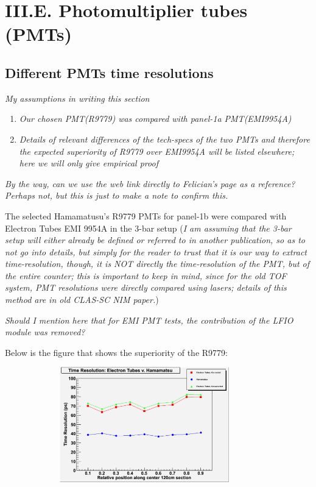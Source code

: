 \documentclass[12pt]{article}
\begin{document}
\maketitle


\section{III.E. Photomultiplier tubes (PMTs)}

\subsection{Different PMTs time resolutions}
\textit{My assumptions in writing this section}
\begin{enumerate}
	\item \textit{Our chosen PMT(R9779) was compared with panel-1a PMT(EMI9954A)}
	\item \textit {Details of relevant differences of the tech-specs of the two PMTs and therefore the expected superiority of R9779 over EMI9954A will be listed elsewhere; here we will only give empirical proof}
\end{enumerate}

\textit{By the way, can we use the web link directly to Felician's page as a reference? Perhaps not, but this is just to make a note to confirm this.}

The selected Hamamatusu's R9779 PMTs for panel-1b were compared with Electron Tubes EMI 9954A in the 3-bar setup (\textit{I am assuming that the 3-bar setup will either already be defined or referred to in another publication, so as to not go into details, but simply for the reader to trust that it is our way to extract time-resolution, though, it is NOT directly the time-resolution of the PMT, but of the entire counter; this is important to keep in mind, since for the old TOF system, PMT resolutions were directly compared using lasers; details of this method are in old CLAS-SC NIM paper.})

\textit{Should I mention here that for EMI PMT tests, the contribution of the LFIO module was removed?}

\newpage
Below is the figure that shows the superiority of the R9779:
\begin{figure}[th]
	\includegraphics[width=10cm, height=5cm]{PMTcomparison.pdf}
\end{figure}
\end{document}
